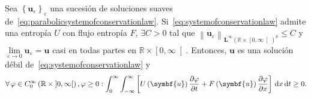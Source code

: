 \begin{theorem}
	Sea
	\begin{math}
		\left\{\symbf{u}_{\varepsilon}\right\}_{\varepsilon}
	\end{math}
	una sucesión de soluciones suaves
	de~\eqref{eq:parabolicsystemofconservationlaw}.
	Si~\eqref{eq:systemofconservationlaw} admite una entropía
	$U$ con flujo entropía $F$, $\exists C>0$ tal que
	\begin{math}
		{\left\|\symbf{u}_{\varepsilon}\right\|}_{
			{\symbf{L}^{\infty}\left(\mathbb{R}\times\left[0,\infty\right[\right)}^{p}
		}\leq C
	\end{math}
	y $\lim\limits_{\varepsilon\to0}\symbf{u}_{\varepsilon}=\symbf{u}$
	casi en todas partes en $\mathbb{R}\times\left[0,\infty\right[$.
	Entonces, $\symbf{u}$ es una solución débil
	de~\eqref{eq:systemofconservationlaw} y
	\begin{equation*}
		\forall\varphi\in
		C^{\infty}_{0}\left(\mathbb{R}\times\left]0,\infty\right[\right),
		\varphi\geq 0:
		\int_{0}^{\infty}
		\int_{-\infty}^{\infty}
		\left[
			U\left(\symbf{u}\right)
			\diffp{\varphi}{t}+
			F\left(\symbf{u}\right)
			\diffp{\varphi}{x}
			\right]
		\dl x
		\dl t\geq 0.
	\end{equation*}
\end{theorem}
